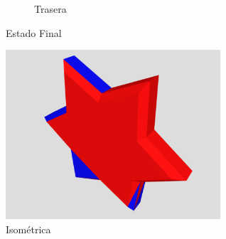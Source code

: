 \documentclass{article}
\begin{document}
\begin{figure}[H]
\begin{subfigure}[b]{0.45\linewidth}
\caption{Trasera}
\end{subfigure}
\caption{Estado Final}
\label{fig:westminster}
\end{figure}

\begin{figure}[H]
\centering
\includegraphics[width=80mm]{star_6_2.png}
\caption{\label{fig1}Isométrica}
\end{figure}

\printbibliography
\end{document}
